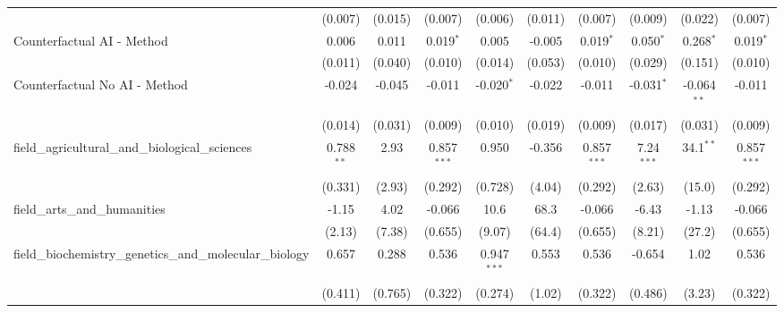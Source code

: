 \begin{tabular}{lccccccccc}
                                                               & (0.007)        & (0.015)        & (0.007)        & (0.006)        & (0.011)       & (0.007)        & (0.009)        & (0.022)        & (0.007)\\   
   Counterfactual AI - Method                                  & 0.006          & 0.011          & 0.019$^{*}$    & 0.005          & -0.005        & 0.019$^{*}$    & 0.050$^{*}$    & 0.268$^{*}$    & 0.019$^{*}$\\   
                                                               & (0.011)        & (0.040)        & (0.010)        & (0.014)        & (0.053)       & (0.010)        & (0.029)        & (0.151)        & (0.010)\\   
   Counterfactual No AI - Method                               & -0.024         & -0.045         & -0.011         & -0.020$^{*}$   & -0.022        & -0.011         & -0.031$^{*}$   & -0.064$^{**}$  & -0.011\\   
                                                               & (0.014)        & (0.031)        & (0.009)        & (0.010)        & (0.019)       & (0.009)        & (0.017)        & (0.031)        & (0.009)\\   
   field\_agricultural\_and\_biological\_sciences              & 0.788$^{**}$   & 2.93           & 0.857$^{***}$  & 0.950          & -0.356        & 0.857$^{***}$  & 7.24$^{***}$   & 34.1$^{**}$    & 0.857$^{***}$\\   
                                                               & (0.331)        & (2.93)         & (0.292)        & (0.728)        & (4.04)        & (0.292)        & (2.63)         & (15.0)         & (0.292)\\   
   field\_arts\_and\_humanities                                & -1.15          & 4.02           & -0.066         & 10.6           & 68.3          & -0.066         & -6.43          & -1.13          & -0.066\\   
                                                               & (2.13)         & (7.38)         & (0.655)        & (9.07)         & (64.4)        & (0.655)        & (8.21)         & (27.2)         & (0.655)\\   
   field\_biochemistry\_genetics\_and\_molecular\_biology      & 0.657          & 0.288          & 0.536          & 0.947$^{***}$  & 0.553         & 0.536          & -0.654         & 1.02           & 0.536\\   
                                                               & (0.411)        & (0.765)        & (0.322)        & (0.274)        & (1.02)        & (0.322)        & (0.486)        & (3.23)         & (0.322)\\   

\end{tabular}
